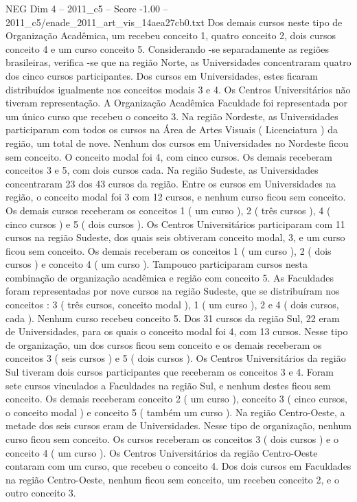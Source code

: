 \begin{textsample}{NEG Dim 4 – 2011\_c5 – Score -1.00 – 2011\_c5/enade\_2011\_art\_vis\_14aea27cb0.txt}
Dos demais cursos neste tipo de Organização Acadêmica, um recebeu conceito 1, quatro conceito 2, dois cursos conceito 4 e um curso conceito 5.
Considerando -se separadamente as regiões brasileiras, verifica -se que na região Norte, as Universidades concentraram quatro dos cinco cursos participantes.
Dos cursos em Universidades, estes ficaram distribuídos igualmente nos conceitos modais 3 e 4.
Os Centros Universitários não tiveram representação.
A Organização Acadêmica Faculdade foi representada por um único curso que recebeu o conceito 3.
Na região Nordeste, as Universidades participaram com todos os cursos na Área de Artes Visuais ( Licenciatura ) da região, um total de nove.
Nenhum dos cursos em Universidades no Nordeste ficou sem conceito.
O conceito modal foi 4, com cinco cursos.
Os demais receberam conceitos 3 e 5, com dois cursos cada.
Na região Sudeste, as Universidades concentraram 23 dos 43 cursos da região.
Entre os cursos em Universidades na região, o conceito modal foi 3 com 12 cursos, e nenhum curso ficou sem conceito.
Os demais cursos receberam os conceitos 1 ( um curso ), 2 ( três cursos ), 4 ( cinco cursos ) e 5 ( dois cursos ).
Os Centros Universitários participaram com 11 cursos na região Sudeste, dos quais seis obtiveram conceito modal, 3, e um curso ficou sem conceito.
Os demais receberam os conceitos 1 ( um curso ), 2 ( dois cursos ) e conceito 4 ( um curso ).
Tampouco participaram cursos nesta combinação de organização acadêmica e região com conceito 5.
As Faculdades foram representadas por nove cursos na região Sudeste, que se distribuíram nos conceitos : 3 ( três cursos, conceito modal ), 1 ( um curso ), 2 e 4 ( dois cursos, cada ).
Nenhum curso recebeu conceito 5.
Dos 31 cursos da região Sul, 22 eram de Universidades, para os quais o conceito modal foi 4, com 13 cursos.
Nesse tipo de organização, um dos cursos ficou sem conceito e os demais receberam os conceitos 3 ( seis cursos ) e 5 ( dois cursos ).
Os Centros Universitários da região Sul tiveram dois cursos participantes que receberam os conceitos 3 e 4.
Foram sete cursos vinculados a Faculdades na região Sul, e nenhum destes ficou sem conceito.
Os demais receberam conceito 2 ( um curso ), conceito 3 ( cinco cursos, o conceito modal ) e conceito 5 ( também um curso ).
Na região Centro-Oeste, a metade dos seis cursos eram de Universidades.
Nesse tipo de organização, nenhum curso ficou sem conceito.
Os cursos receberam os conceitos 3 ( dois cursos ) e o conceito 4 ( um curso ).
Os Centros Universitários da região Centro-Oeste contaram com um curso, que recebeu o conceito 4.
Dos dois cursos em Faculdades na região Centro-Oeste, nenhum ficou sem conceito, um recebeu conceito 2, e o outro conceito 3.

\end{textsample}
